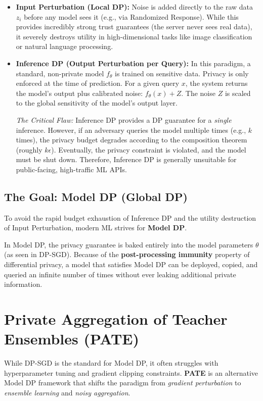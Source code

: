\documentclass[11pt, a4paper]{article}
\begin{document}
\begin{itemize}
    \item \textbf{Input Perturbation (Local DP):}
    Noise is added directly to the raw data $z_i$ before any model sees it (e.g., via Randomized Response). While this provides incredibly strong trust guarantees (the server never sees real data), it severely destroys utility in high-dimensional tasks like image classification or natural language processing.
    
    \item \textbf{Inference DP (Output Perturbation per Query):}
    In this paradigm, a standard, non-private model $f_\theta$ is trained on sensitive data. Privacy is only enforced at the time of prediction. For a given query $x$, the system returns the model's output plus calibrated noise: $f_\theta(x) + Z$. The noise $Z$ is scaled to the global sensitivity of the model's output layer. 
    
    \textit{The Critical Flaw:} Inference DP provides a DP guarantee for a \textit{single} inference. However, if an adversary queries the model multiple times (e.g., $k$ times), the privacy budget degrades according to the composition theorem (roughly $k\epsilon$). Eventually, the privacy constraint is violated, and the model must be shut down. Therefore, Inference DP is generally unsuitable for public-facing, high-traffic ML APIs.
\end{itemize}

\subsection{The Goal: Model DP (Global DP)}
To avoid the rapid budget exhaustion of Inference DP and the utility destruction of Input Perturbation, modern ML strives for \textbf{Model DP}. 

In Model DP, the privacy guarantee is baked entirely into the model parameters $\theta$ (as seen in DP-SGD). Because of the \textbf{post-processing immunity} property of differential privacy, a model that satisfies Model DP can be deployed, copied, and queried an infinite number of times without ever leaking additional private information.


\section{Private Aggregation of Teacher Ensembles (PATE)}

While DP-SGD is the standard for Model DP, it often struggles with hyperparameter tuning and gradient clipping constraints. \textbf{PATE} is an alternative Model DP framework that shifts the paradigm from \textit{gradient perturbation} to \textit{ensemble learning} and \textit{noisy aggregation}. 
\end{document}

